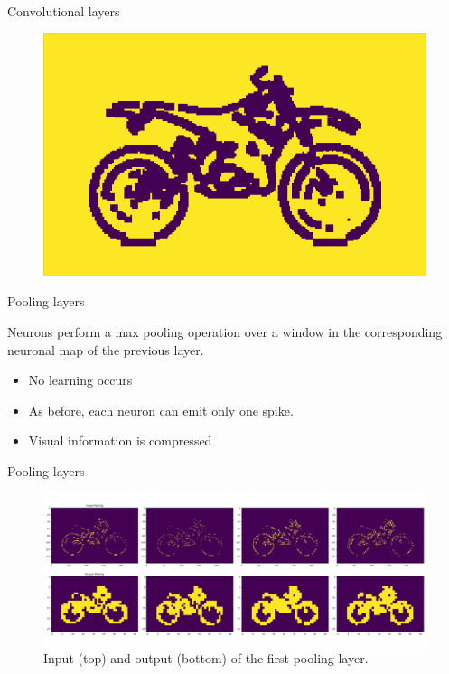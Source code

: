 \documentclass[10pt]{beamer}
\begin{document}
\begin{frame}{Convolutional layers}
\begin{figure}[h]
\begin{minipage}[b]{0.3\textwidth}
	\end{minipage}
	\hfill
	\begin{minipage}[b]{0.3\textwidth}
		\includegraphics[width=\textwidth]{images/K_3}
	\end{minipage}
\end{figure}

\end{frame}


\begin{frame}{Pooling layers}

Neurons perform a max pooling operation over a window in the corresponding neuronal map of the previous layer.

\begin{itemize}
	\item No learning occurs
	
	\item As before, each neuron can emit only one spike.
	
	\item Visual information
	is compressed
\end{itemize}

\end{frame}

\begin{frame}{Pooling layers}

\begin{figure}[h]
	\centering
	\includegraphics[width=\textwidth]{images/pool_slice1}
	\caption{Input (top) and output (bottom) of the first pooling layer.}
\end{figure}

\end{frame}
\end{document}
